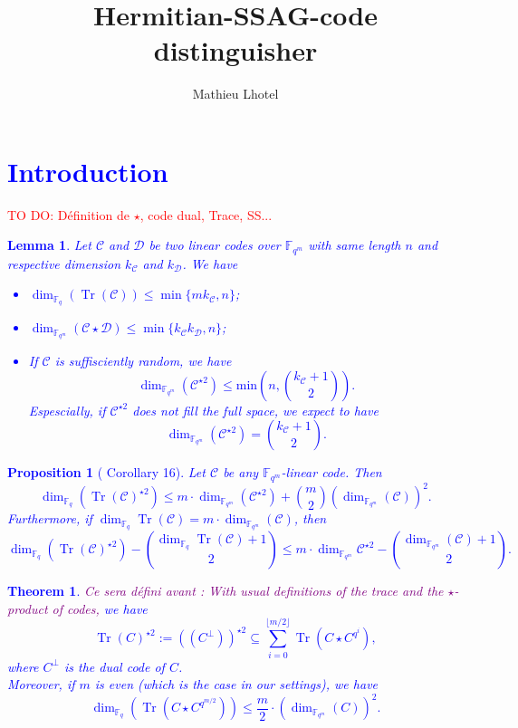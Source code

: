 \documentclass[a4paper]{article}
\title{Hermitian-SSAG-code distinguisher}
\author{Mathieu Lhotel}
\date{}
\newtheorem{prop1}{Proposition}
\newtheorem{thm}{Theorem}
\newtheorem{lem1}{Lemma}
\newcommand{\calC}{\mathcal{C}}
\newcommand{\calD}{\mathcal{D}}
\newcommand{\Tr}{\operatorname{Tr}}
\newcommand{\fqm}{\mathbb{F}_{q^m}}
\newcommand{\fq}{\mathbb{F}_{q}}
\newcommand\jade[1]{\textcolor{purple}{#1}}
\newcommand\TODO[1]{\textcolor{red}{TO DO: #1}}
\begin{document}
\maketitle

\section{\textcolor{blue}{Introduction}}

\TODO{Définition de $\star$, code dual, Trace, SS...}


\textcolor{blue}{
	\begin{lem1} \label{known_bounds}
		Let $\calC$ and $\calD$ be two linear codes over $\fqm$ with same length $n$ and respective dimension $k_{\calC}$ and $k_{\calD}$. We have
		\begin{itemize}
			\item[$(1)$] $\dim_{\mathbb{F}_q}(\Tr(\calC)) \leq \min\{mk_{\calC},n\}$;
			\item[$(2)$] $\dim_{\fqm}(\calC \star \calD) \leq \min\{k_{\calC}k_{\calD},n\}$;
			\item[$(3)$] If $\calC$ is suffisciently random, we have
			\[ \dim_{\mathbb{F}_{q^m}}(\calC^{\star2}) \leq \mathrm{min}\left(n,\binom{k_{\calC}+1}{2}\right) . \]
			Espescially, if $\calC^{\star2}$ does not fill the full space, we expect to have 
			\[ \dim_{\mathbb{F}_{q^m}}(\calC^{\star2}) = \binom{k_{\calC}+1}{2}.\]
		\end{itemize}
	\end{lem1}
}
\textcolor{blue}{	
	\begin{prop1} [\cite{rocco} Corollary 16]\label{1st bound square of trace}
		Let $\calC$ be any $\fqm$-linear code. Then 
		\begin{equation} \label{bbbound}
			\dim_{\fq}(\Tr(\mathcal{C})^{\star2}) \leq m \cdot \dim_{\fqm}(\calC^{\star 2}) + \binom{m}{2} (\dim_{\fqm}(\calC))^2.
		\end{equation}
		Furthermore, if $\dim_{\fq} \Tr(\calC) = m \cdot \dim_{\fqm}(\calC)$, then 
		\[\dim_{\fq} (\Tr(\calC)^{\star 2}) - \binom{\dim_{\fq} \Tr(\calC)+1}{2} \leq m \cdot \dim_{\fqm} \calC^{\star 2} - \binom{\dim_{\fqm} (\calC)+1}{2}.\]
	\end{prop1}
}

\textcolor{blue}{\begin{thm} \label{th1}
		\jade{Ce sera défini avant : With usual definitions of the trace and the $\star$-product of codes,} we have 
		\[ \Tr(C)^{\star2} := ((C^{\perp}))^{\star2} \subseteq \sum\limits_{i=0}^{\lfloor{m/2} \rfloor} \Tr(C\star C^{q^i}),\]
		where $C^{\perp}$ is the dual code of $C$. \\
		Moreover, if $m$ is even (which is the case in our settings), we have 
		\[\dim_{\mathbb{F}_q}(\Tr(C \star C^{q^{m/2}})) \leq \frac{m}{2}\cdot (\dim_{\fqm}(C))^2.\]
	\end{thm}
}
\end{document}

